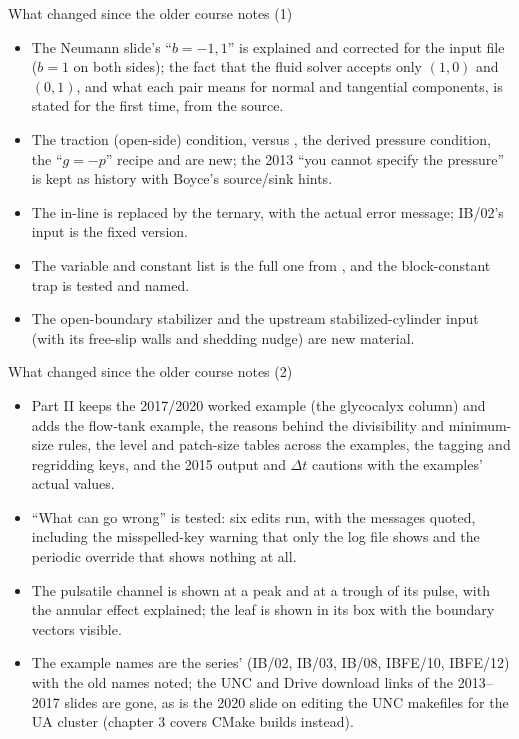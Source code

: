 \documentclass[aspectratio=169,11pt]{beamer}
\begin{document}
\begin{frame}{What changed since the older course notes (1)}
\label{fr:changed}
\small
\begin{itemize}
  \item The Neumann slide's ``$b = -1, 1$'' is explained and corrected for the input file ($b = 1$ on both sides); the fact that the fluid solver accepts only $(1,0)$ and $(0,1)$, and what each pair means for normal and tangential components, is stated for the first time, from the source.
  \item The traction (open-side) condition,  versus , the derived pressure condition, the ``$g = -p$'' recipe and  are new; the 2013 ``you cannot specify the pressure'' is kept as history with Boyce's source/sink hints.
  \item The in-line  is replaced by the ternary, with the actual error message; IB/02's input is the fixed version.
  \item The variable and constant list is the full one from , and the block-constant trap is tested and named.
  \item The open-boundary stabilizer and the upstream stabilized-cylinder input (with its free-slip walls and shedding nudge) are new material.
\end{itemize}
\end{frame}

\begin{frame}{What changed since the older course notes (2)}
\label{fr:changed2}
\small
\begin{itemize}
  \item Part II keeps the 2017/2020 worked example (the glycocalyx column) and adds the flow-tank example, the reasons behind the divisibility and minimum-size rules, the level and patch-size tables across the examples, the tagging and regridding keys, and the 2015 output and $\Delta t$ cautions with the examples' actual values.
  \item ``What can go wrong'' is tested: six edits run, with the messages quoted, including the misspelled-key warning that only the log file shows and the periodic override that shows nothing at all.
  \item The pulsatile channel is shown at a peak and at a trough of its pulse, with the annular effect explained; the leaf is shown in its box with the boundary vectors visible.
  \item The example names are the series' (IB/02, IB/03, IB/08, IBFE/10, IBFE/12) with the old names noted; the UNC and Drive download links of the 2013--2017 slides are gone, as is the 2020 slide on editing the UNC makefiles for the UA cluster (chapter 3 covers CMake builds instead).
\end{itemize}
\end{frame}
\end{document}
